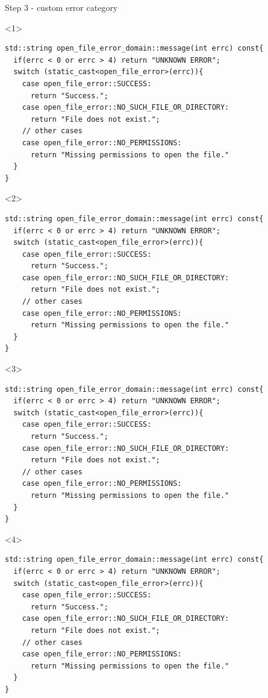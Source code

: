 \documentclass[10pt]{beamer}
\begin{document}
\begin{frame}[fragile]{Step 3 - custom error category}
	\begin{onlyenv}
	\begin{verbatim}
std::string open_file_error_domain::message(int errc) const{
  if(errc < 0 or errc > 4) return "UNKNOWN ERROR";
  switch (static_cast<open_file_error>(errc)){
    case open_file_error::SUCCESS:
      return "Success.";
    case open_file_error::NO_SUCH_FILE_OR_DIRECTORY:
      return "File does not exist.";
    // other cases
    case open_file_error::NO_PERMISSIONS:
      return "Missing permissions to open the file."
  }
}
	\end{verbatim}
	\end{onlyenv}

	\begin{onlyenv}
	\begin{verbatim}
std::string open_file_error_domain::message(int errc) const{
  if(errc < 0 or errc > 4) return "UNKNOWN ERROR";
  switch (static_cast<open_file_error>(errc)){
    case open_file_error::SUCCESS:
      return "Success.";
    case open_file_error::NO_SUCH_FILE_OR_DIRECTORY:
      return "File does not exist.";
    // other cases
    case open_file_error::NO_PERMISSIONS:
      return "Missing permissions to open the file."
  }
}
	\end{verbatim}
	\end{onlyenv}

	\begin{onlyenv}
	\begin{verbatim}
std::string open_file_error_domain::message(int errc) const{
  if(errc < 0 or errc > 4) return "UNKNOWN ERROR";
  switch (static_cast<open_file_error>(errc)){
    case open_file_error::SUCCESS:
      return "Success.";
    case open_file_error::NO_SUCH_FILE_OR_DIRECTORY:
      return "File does not exist.";
    // other cases
    case open_file_error::NO_PERMISSIONS:
      return "Missing permissions to open the file."
  }
}
\end{verbatim}
	\end{onlyenv}

	\begin{onlyenv}
	\begin{verbatim}
std::string open_file_error_domain::message(int errc) const{
  if(errc < 0 or errc > 4) return "UNKNOWN ERROR";
  switch (static_cast<open_file_error>(errc)){
    case open_file_error::SUCCESS:
      return "Success.";
    case open_file_error::NO_SUCH_FILE_OR_DIRECTORY:
      return "File does not exist.";
    // other cases
    case open_file_error::NO_PERMISSIONS:
      return "Missing permissions to open the file."
  }
}
\end{verbatim}
	\end{onlyenv}


\end{frame}
\end{document}
